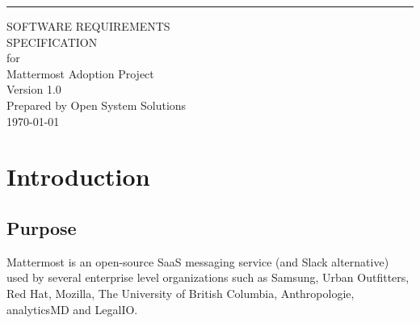 \documentclass{scrreprt}
\date{}
\def\myversion{1.0 }
\begin{document}
\begin{flushright}
    \rule{16cm}{5pt}\vskip1cm
    \begin{bfseries}
        \Huge{SOFTWARE REQUIREMENTS\\ SPECIFICATION}\\
        \vspace{1.9cm}
        for\\
        \vspace{1.9cm}
        Mattermost Adoption Project\\
        \vspace{1.9cm}
        \LARGE{Version \myversion}\\
        \vspace{1.9cm}
        Prepared by Open System Solutions\\
        \vspace{1.9cm}
        \today\\
    \end{bfseries}
\end{flushright}

\tableofcontents


%

\chapter{Introduction}

\section{Purpose}
Mattermost is an open-source SaaS messaging service (and Slack alternative) used
by several enterprise level organizations such as Samsung, Urban Outfitters,
Red Hat, Mozilla, The University of British Columbia, Anthropologie, analyticsMD
and LegalIO.\\
\end{document}
